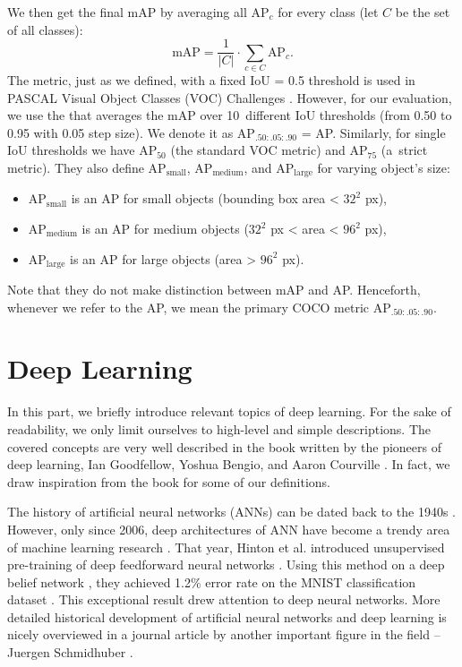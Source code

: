 We then get the final mAP by averaging all AP$_c$ for every class (let $C$ be
the set of all classes):
$$
    \text{mAP} = \frac{1}{\lvert C \rvert} \cdot \sum_{ c\in C} \text{AP}_c.
$$
The metric, just as we defined, with a fixed IoU = 0.5 threshold is used in PASCAL
Visual Object Classes (VOC) Challenges \cite{voc}. However, for our evaluation,
we use the 
\cite{coco} that averages the mAP over 10~different IoU thresholds (from 0.50
to 0.95 with 0.05 step size). We denote it as AP$_{.50:.05:.90}$ = AP.
Similarly, for single IoU thresholds we have AP$_{50}$ (the standard VOC metric)
and AP$_{75}$ (a~strict metric). They also define AP$_\text{small}$,
AP$_\text{medium}$, and AP$_\text{large}$ for varying object's size:
\begin{itemize}
    \item AP$_\text{small}$ is an AP for small objects (bounding box area <
          $32^2$ px),
    \item AP$_\text{medium}$ is an AP for medium objects ($32^2$ px < area <
          $96^2$ px),
    \item AP$_\text{large}$ is an AP for large objects (area > $96^2$ px).
\end{itemize}
Note that they do not make distinction between mAP and AP. Henceforth, whenever
we refer to the AP, we mean the primary COCO metric AP$_{.50:.05:.90}$.

\section{Deep Learning}\label{deep_learning_chapter}
In this part, we briefly introduce relevant topics of deep learning. For the
sake of readability, we only limit ourselves to high-level and simple
descriptions. The covered concepts are very well described in the book written
by the pioneers of deep learning, Ian Goodfellow, Yoshua Bengio, and Aaron
Courville \cite{Goodfellow-et-al-2016}. In fact, we draw inspiration from the
book for some of our definitions.

The history of artificial neural networks (ANNs) can be dated back to the 1940s
\cite{McCulloch_1943}. However, only since 2006, deep architectures of ANN have
become a trendy area of machine learning research
\cite{DBLP:journals/corr/Schmidhuber14}. That year, Hinton et al. introduced
unsupervised pre-training of deep feedforward neural networks
\cite{hinton2006reducing}. Using this method on a deep belief network
\cite{DBN}, they achieved 1.2\% error rate on the MNIST classification
dataset \cite{hinton2006fast, mnist}. This exceptional result drew attention
to deep neural networks. More detailed historical development of artificial
neural networks and deep learning is nicely overviewed in a journal article by
another important figure in the field -- Juergen Schmidhuber
\cite{DBLP:journals/corr/Schmidhuber14}.

